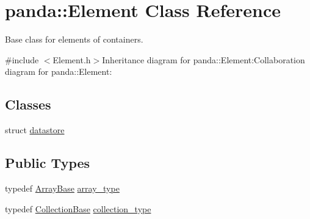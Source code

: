 \hypertarget{classpanda_1_1Element}{
\section{panda::Element Class Reference}
\label{classpanda_1_1Element}
}


Base class for elements of containers.  


{\ttfamily \#include $<$Element.h$>$}Inheritance diagram for panda::Element:Collaboration diagram for panda::Element:\subsection*{Classes}
\begin{DoxyCompactItemize}
\item 
struct \hyperlink{structpanda_1_1Element_1_1datastore}{datastore}
\end{DoxyCompactItemize}
\subsection*{Public Types}
\begin{DoxyCompactItemize}
\item 
typedef \hyperlink{classpanda_1_1ArrayBase}{ArrayBase} \hyperlink{classpanda_1_1Element_ab2756a177602f7ab426c4e5d5dbb3b68}{array\_\-type}
\item 
typedef \hyperlink{classpanda_1_1CollectionBase}{CollectionBase} \hyperlink{classpanda_1_1Element_ae8518ee6466644a9abe229a1da0bae57}{collection\_\-type}
\end{DoxyCompactItemize}

